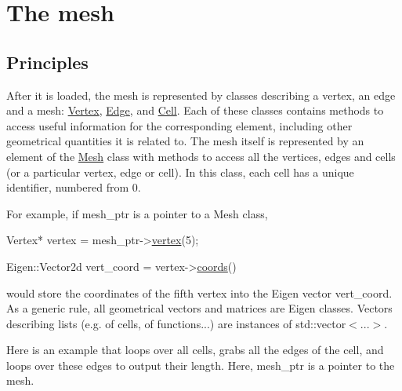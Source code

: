 \label{_mesh}%
 \hypertarget{index_mesh}{}\section{The mesh}\label{index_mesh}
\hypertarget{index_meshpple}{}\subsection{Principles}\label{index_meshpple}
After it is loaded, the mesh is represented by classes describing a vertex, an edge and a mesh\+: \hyperlink{classHArDCore2D_1_1Vertex}{Vertex}, \hyperlink{classHArDCore2D_1_1Edge}{Edge}, and \hyperlink{classHArDCore2D_1_1Cell}{Cell}. Each of these classes contains methods to access useful information for the corresponding element, including other geometrical quantities it is related to. The mesh itself is represented by an element of the \hyperlink{classHArDCore2D_1_1Mesh}{Mesh} class with methods to access all the vertices, edges and cells (or a particular vertex, edge or cell). In this class, each cell has a unique identifier, numbered from 0.

For example, if {\ttfamily mesh\+\_\+ptr} is a pointer to a Mesh class, 
\begin{DoxyCode}
Vertex* vertex = mesh\_ptr->\hyperlink{classHArDCore2D_1_1Mesh_ad099224c697c05a57fad6a47fdcd9e76}{vertex}(5);

Eigen::Vector2d vert\_coord = vertex->\hyperlink{group__Mesh_gade92964c93627c034b021c1d23075a79}{coords}()
\end{DoxyCode}
 would store the coordinates of the fifth vertex into the Eigen vector vert\+\_\+coord. As a generic rule, all geometrical vectors and matrices are Eigen classes. Vectors describing lists (e.\+g. of cells, of functions...) are instances of {\ttfamily std\+::vector$<$...$>$}.

Here is an example that loops over all cells, grabs all the edges of the cell, and loops over these edges to output their length. Here, {\ttfamily mesh\+\_\+ptr} is a pointer to the mesh.


